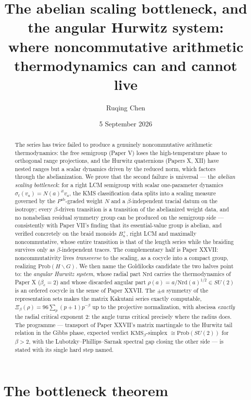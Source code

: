 \documentclass[11pt]{amsart}
\title[The abelian scaling bottleneck and the angular system]{The abelian scaling bottleneck, and the angular Hurwitz system:\\ where noncommutative arithmetic thermodynamics can and cannot live}
\author{Ruqing Chen}
\date{5 September 2026}
\theoremstyle{remark}
\newcommand{\Prob}{\mathrm{Prob}}
\newcommand{\Nrd}{\mathrm{Nrd}}
\begin{document}
\begin{abstract}
The series has twice failed to produce a genuinely noncommutative arithmetic
thermodynamics: the free semigroup (Paper V) loses the high-temperature phase to
orthogonal range projections, and the Hurwitz quaternions (Papers X, XII) have nested
ranges but a scalar dynamics driven by the reduced norm, which factors through the
abelianization. We prove that the second failure is universal --- the \emph{abelian
scaling bottleneck}: for a right LCM semigroup with scalar one-parameter dynamics
$\sigma_t(v_a)=N(a)^{it}v_a$, the KMS classification data splits into a scaling measure
governed by the $P^{\mathrm{ab}}$-graded weight $N$ and a $\beta$-independent tracial datum on
the isotropy; every $\beta$-driven transition is a transition of the abelianized weight
data, and no nonabelian residual symmetry group can be produced on the semigroup side
--- consistently with Paper VII's finding that its essential-value group is abelian, and
verified concretely on the braid monoids $B_n^+$, right LCM and maximally noncommutative,
whose entire transition is that of the length series while the braiding survives only as
$\beta$-independent traces. The complementary half is Paper XXVII: noncommutativity lives
\emph{transverse} to the scaling, as a cocycle into a compact group, realizing
$\Prob(H\backslash G)$. We then name the Goldilocks candidate the two halves point to:
the \emph{angular Hurwitz system}, whose radial part $\Nrd$ carries the thermodynamics of
Paper X ($\beta_c=2$) and whose discarded angular part $\rho(a)=a/\Nrd(a)^{1/2}\in SU(2)$
is an ordered cocycle in the sense of Paper XXVII. The $\pm a$ symmetry of the
representation sets makes the matrix Kakutani series exactly computable,
$\Xi_\beta(\rho)=96\sum_p(p{+}1)p^{-\beta}$ up to the projective normalization, with
abscissa \emph{exactly} the radial critical exponent $2$: the angle turns critical
precisely where the radius does. The programme --- transport of Paper XXVII's matrix
martingale to the Hurwitz tail relation in the Gibbs phase, expected verdict
$\mathrm{KMS}_\beta$-simplex $\cong\Prob(SU(2))$ for $\beta>2$, with the
Lubotzky--Phillips--Sarnak spectral gap closing the other side --- is stated with its
single hard step named.
\end{abstract}

\maketitle

\section{The bottleneck theorem}\label{sec:bottleneck}
\end{document}
